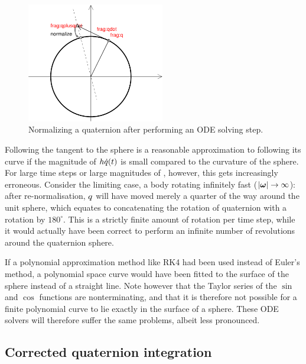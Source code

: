 \begin{figure}
\centerline{\includegraphics[width=6cm]{figures/quaternion1}}
\caption{Normalizing a quaternion after performing an ODE solving step.
    \label{quatNormalizationFigure}}
\end{figure}

Following the tangent to the sphere is a reasonable approximation to following its curve if the
magnitude of $h \dot{q}(t)$ is small compared to the curvature of the sphere.
For large time steps or large magnitudes of \ve{\omega}, however, this gets increasingly
erroneous. Consider the limiting case, a body rotating infinitely fast
($\norm{\ve{\omega}} \rightarrow \infty$): after re-normalisation, $q$ will have moved merely
a quarter of the way around the unit sphere, which equates to concatenating the rotation of
quaternion  with a rotation by $180^\circ$. This is a strictly finite amount of rotation
per time step, while it would actually have been correct to perform an infinite number of
revolutions around the quaternion sphere.

If a polynomial approximation method like RK4 had been used instead of Euler's method, a
polynomial space curve would have been fitted to the surface of the sphere instead of a straight
line. Note however that the Taylor series of the $\sin$ and $\cos$ functions are nonterminating,
and that it is therefore not possible for a finite polynomial curve to lie exactly in the surface
of a sphere. These ODE solvers will therefore suffer the same problems, albeit less pronounced.


\subsection{Corrected quaternion integration\label{quatIntegrationDerivation}}


